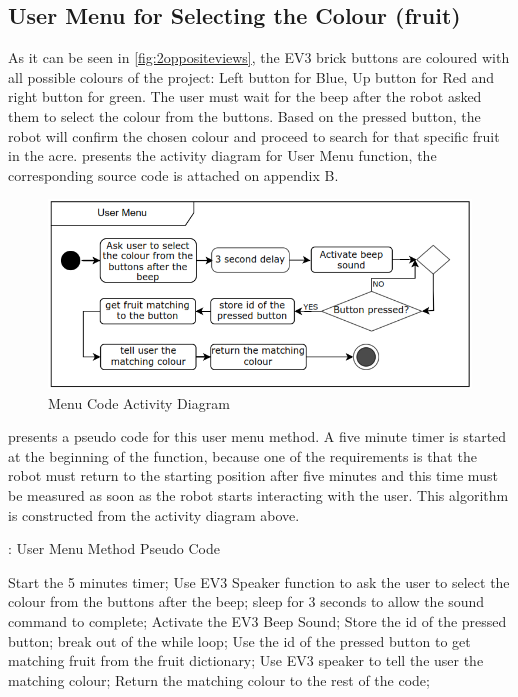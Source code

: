 \newpage
\subsection{User Menu for Selecting the Colour (fruit)}\label{sec:menuCode}

\noindent As it can be seen in \vref{fig:2oppositeviews}, the EV3 brick buttons are coloured with all possible colours of the project: Left button for Blue, Up button for Red and right button for green. The user must wait for the beep after the robot asked them to select the colour from the buttons. Based on the pressed button, the robot will confirm the chosen colour and proceed to search for that specific fruit in the acre.  presents the activity diagram for User Menu function, the corresponding source code is attached on appendix B.

\begin{figure}[!ht]
	\centering
	\includegraphics[width=\linewidth]{Graphics/menuCodeActivityDiagram}
	\caption{Menu Code Activity Diagram}
	\label{fig:menuCodeActivityDiagram}
\end{figure}
\vspace{-3mm}
\noindent {} presents a pseudo code for this user menu method. A five minute timer is started at the beginning of the function, because one of the requirements is that the robot must return to the starting position after five minutes and this time must be measured as soon as the robot starts interacting with the user. This algorithm is constructed from the activity diagram above.

\begin{algorithm}
	\caption{: User Menu Method Pseudo Code}\label{menuPseudo}
	\begin{algorithmic}[1]
		\State Start the 5 minutes timer;
		\State Use EV3 Speaker function to ask the user to select the colour from the buttons after the beep;
		\State sleep for 3 seconds to allow the sound command to complete;
		\State Activate the EV3 Beep Sound;
		\State Store the id of the pressed button;
		\State break out of the while loop;
		\EndIf
		\EndWhile
		\State Use the id of the pressed button to get matching fruit from the fruit dictionary;
		\State Use EV3 speaker to tell the user the matching colour;
		\State Return the matching colour to the rest of the code;
	\end{algorithmic}
\end{algorithm}

